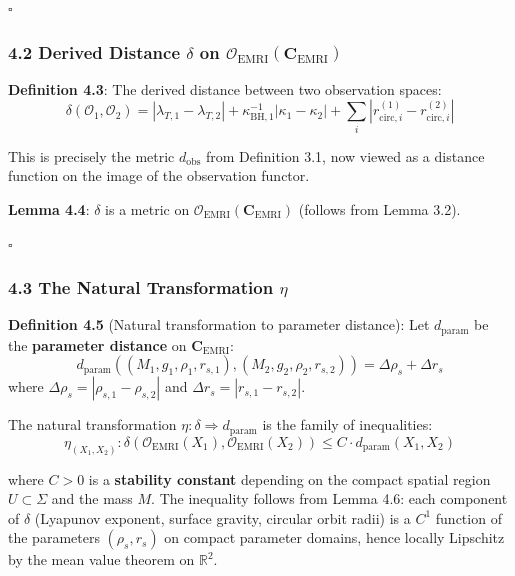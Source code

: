 \documentclass[
]{article}
\begin{document}
\(\square\)

\subsubsection{\texorpdfstring{4.2 Derived Distance \(\delta\) on
\(\mathcal{O}_{\text{EMRI}}(\mathbf{C}_{\text{EMRI}})\)}{4.2 Derived Distance \textbackslash delta on \textbackslash mathcal\{O\}\_\{\textbackslash text\{EMRI\}\}(\textbackslash mathbf\{C\}\_\{\textbackslash text\{EMRI\}\})}}\label{derived-distance-delta-on-mathcalo_textemrimathbfc_textemri}

\textbf{Definition 4.3}: The derived distance between two observation
spaces:
\[\delta(\mathcal{O}_1, \mathcal{O}_2) = |\lambda_{T,1} - \lambda_{T,2}| + \kappa_{\text{BH},1}^{-1}|\kappa_1 - \kappa_2| + \sum_i |r_{\text{circ},i}^{(1)} - r_{\text{circ},i}^{(2)}|\]

This is precisely the metric \(d_{\text{obs}}\) from Definition 3.1, now
viewed as a distance function on the image of the observation functor.

\textbf{Lemma 4.4}: \(\delta\) is a metric on
\(\mathcal{O}_{\text{EMRI}}(\mathbf{C}_{\text{EMRI}})\) (follows from
Lemma 3.2).

\(\square\)

\subsubsection{\texorpdfstring{4.3 The Natural Transformation
\(\eta\)}{4.3 The Natural Transformation \textbackslash eta}}\label{the-natural-transformation-eta}

\textbf{Definition 4.5} (Natural transformation to parameter distance):
Let \(d_{\text{param}}\) be the \textbf{parameter distance} on
\(\mathbf{C}_{\text{EMRI}}\):
\[d_{\text{param}}((M_1, g_1, \rho_1, r_{s,1}), (M_2, g_2, \rho_2, r_{s,2})) = \Delta\rho_s + \Delta r_s\]
where \(\Delta\rho_s = |\rho_{s,1} - \rho_{s,2}|\) and
\(\Delta r_s = |r_{s,1} - r_{s,2}|\).

The natural transformation \(\eta: \delta \Rightarrow d_{\text{param}}\)
is the family of inequalities:
\[\eta_{(X_1, X_2)}: \delta(\mathcal{O}_{\text{EMRI}}(X_1), \mathcal{O}_{\text{EMRI}}(X_2)) \leq C \cdot d_{\text{param}}(X_1, X_2)\]

where \(C > 0\) is a \textbf{stability constant} depending on the
compact spatial region \(U \subset \Sigma\) and the mass \(M\). The
inequality follows from Lemma 4.6: each component of \(\delta\)
(Lyapunov exponent, surface gravity, circular orbit radii) is a \(C^1\)
function of the parameters \((\rho_s, r_s)\) on compact parameter
domains, hence locally Lipschitz by the mean value theorem on
\(\mathbb{R}^2\).
\end{document}
